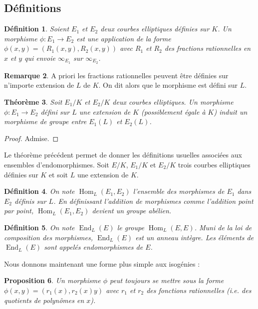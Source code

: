 \documentclass{article}
\theoremstyle{plain}%
\newtheorem{thm}{Théorème}[section]
\newtheorem{prop}[thm]{Proposition}
\newtheorem{deff}[thm]{Définition}
\theoremstyle{definition}%
\newtheorem{rem}[thm]{Remarque}
\DeclareMathOperator{\End}{End}
\DeclareMathOperator{\Hom}{Hom}
\begin{document}
\subsection{Définitions}

\begin{deff}
  Soient $E_1$ et $E_2$ deux courbes elliptiques définies sur $K$. Un morphisme $\phi : E_1\to  E_2$ est une application de la forme $\phi(x, y) = (R_1(x, y), R_2(x, y))$ avec $R_1$ et $R_2$ des fractions rationnelles en $x$ et $y$ qui envoie $\infty_{E_1}$ sur $\infty_{E_2}$.
\end{deff}

\begin{rem}
  A priori les fractions rationnelles peuvent être définies sur n'importe extension de $L$ de $K$. On dit alors que le morphisme est défini sur $L$.
\end{rem}

\begin{thm}
  Soit $E_1/K$ et $E_2/K$ deux courbes elliptiques. Un morphisme $\phi : E_1\to  E_2$ défini sur $L$ une extension de $K$ (possiblement égale à $K$) induit un morphisme de groupe entre $E_1(L)$ et $E_2(L)$. 
\end{thm}

\begin{proof}
  Admise. 
\end{proof}

Le théorème précédent permet de donner les définitions usuelles associées aux ensembles d'endomorphismes. Soit $E/K$, $E_1/K$ et $E_2/K$ trois courbes elliptiques définies sur $K$ et soit $L$ une extension de $K$.

\begin{deff}
  On note $\Hom_L(E_1, E_2)$ l'ensemble des morphismes de $E_1$ dans $E_2$ définis sur $L$. En définissant l'addition de morphismes comme l'addition point par point, $\Hom_L(E_1, E_2)$ devient un groupe abélien.
\end{deff}

\begin{deff}
  On note $\End_L(E)$ le groupe $\Hom_L(E, E)$. Muni de la loi de composition des morphismes, $\End_L(E)$ est un anneau intègre. Les éléments de $\End_L(E)$ sont appelés endomorphismes de $E$.
\end{deff}


 Nous donnons maintenant une forme plus simple aux isogénies :


\begin{prop}
  Un morphisme $\phi$ peut toujours se mettre sous la forme $\phi(x, y) = (r_1(x), r_2(x)y)$ avec $r_1$ et $r_2$ des fonctions rationnelles (i.e. des quotients de polynômes en $x$).
\end{prop}
\end{document}
